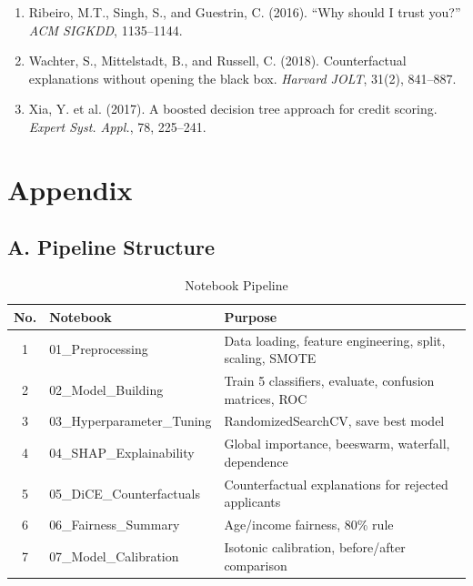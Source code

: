 \documentclass[12pt]{report}
\begin{document}
\begin{enumerate}[nosep]
\item Ribeiro, M.T., Singh, S., and Guestrin, C. (2016). ``Why should I trust you?'' \emph{ACM SIGKDD}, 1135--1144.

\item Wachter, S., Mittelstadt, B., and Russell, C. (2018). Counterfactual explanations without opening the black box. \emph{Harvard JOLT}, 31(2), 841--887.

\item Xia, Y. et al. (2017). A boosted decision tree approach for credit scoring. \emph{Expert Syst. Appl.}, 78, 225--241.

\end{enumerate}



\chapter*{Appendix\hfill} 

\section*{A. Pipeline Structure}

\begin{table}[H]
\centering
\caption{Notebook Pipeline}
\label{tab:pipeline}
\begin{tabular}{clp{7cm}}
\toprule
\textbf{No.} & \textbf{Notebook} & \textbf{Purpose} \\
\midrule
1 & 01\_Preprocessing & Data loading, feature engineering, split, scaling, SMOTE \\
2 & 02\_Model\_Building & Train 5 classifiers, evaluate, confusion matrices, ROC \\
3 & 03\_Hyperparameter\_Tuning & RandomizedSearchCV, save best model \\
4 & 04\_SHAP\_Explainability & Global importance, beeswarm, waterfall, dependence \\
5 & 05\_DiCE\_Counterfactuals & Counterfactual explanations for rejected applicants \\
6 & 06\_Fairness\_Summary & Age/income fairness, 80\% rule \\
7 & 07\_Model\_Calibration & Isotonic calibration, before/after comparison \\
\bottomrule
\end{tabular}
\end{table}
\end{document}

